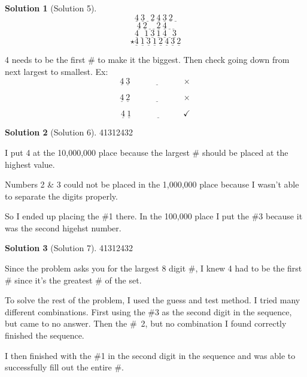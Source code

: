 \documentclass[10pt, reqno]{amsart}
\theoremstyle{remark}
\theoremstyle{definition}
\newtheorem*{sol*}{Solution}
\numberwithin{equation}{section}  %
\begin{document}
\begin{sol*}[Solution 5]
\[
\underline{4} \ \underline{3} \ \underline{\ } \ \underline{2}\  \underline{4}\ \underline{3} \ \underline{2} \ \underline{\ }
\]
\[
\underline{4} \ \underline{2} \ \underline{\ } \ \underline{\ }\  \underline{2}\ \underline{4} \ \underline{\ } \ \underline{\ }
\]
\[
\underline{4} \ \underline{\ } \ \underline{1} \ \underline{3}\  \underline{1}\ \underline{4} \ \underline{\ } \ \underline{3 }
\]
\[
\star \underline{4} \ \underline{1} \ \underline{ 3} \ \underline{1}\  \underline{2}\ \underline{4} \ \underline{3} \ \underline{2}
\]



4 needs to be the first \# to make it the biggest.  Then check going down from next largest to smallest.  Ex:
\[
\underline{4} \ \underline{3} \ \underline{\qquad \qquad \qquad  } \times
\]

\[
\underline{4} \ \underline{2} \ \underline{\qquad \qquad \qquad  } \times
\]

\[
\underline{4} \ \underline{1} \ \underline{\qquad \qquad \qquad  } \checkmark
\]

\end{sol*}


\begin{sol*}[Solution 6]
41312432



I put 4 at the 10,000,000 place because the largest \# should be placed at the highest value.




Numbers 2 \& 3 could not be placed in the 1,000,000 place because I wasn't able to separate the digits properly.




So I ended up placing the \#1 there.  In the 100,000 place I put the \#3 because it was the second higehst number.

\end{sol*}



\begin{sol*}[Solution 7]

41312432



Since the problem asks you for the largest 8 digit \#, I knew 4 had to be the first \# since it's the greatest \# of the set.





To solve the rest of the problem, I used the guess and test method.  I tried many different combinations.  First using the \#3 as the second digit in the sequence, but came to no answer.  Then the \#~2, but no combination I found  correctly finished the sequence.



I then finished with the \#1 in the second digit in the sequence and was able to successfully fill out the entire \#.

\end{sol*}
\end{document}
